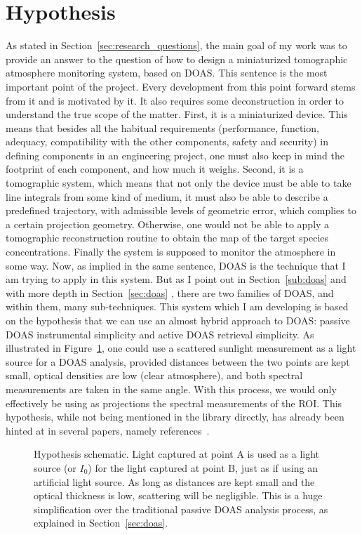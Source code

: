 

\section{Hypothesis}%
\label{sec:intro_hypothesis}

As stated in Section~\ref{sec:research_questions}, the main goal of my
work was to provide an answer to the question of how to design a
miniaturized tomographic atmosphere monitoring system, based on
\gls{DOAS}.  This sentence is the most important point of the project.
Every development from this point forward stems from it and is motivated
by it. It also requires some deconstruction in order to understand the
true scope of the matter. First, it is a miniaturized device. This means
that besides all the habitual requirements (performance, function,
adequacy, compatibility with the other components, safety and security)
in defining components in an engineering project, one must also keep in
mind the footprint of each component, and how much it weighs. Second, it
is a tomographic system, which means that not only the device must be
able to take line integrals from some kind of medium, it must also be
able to describe a predefined trajectory, with admissible levels of
geometric error, which complies to a certain projection geometry.
Otherwise, one would not be able to apply a tomographic reconstruction
routine to obtain the map of the target species concentrations. Finally
the system is supposed to monitor the atmosphere in some way. Now, as
implied in the same sentence, \gls{DOAS} is the technique that I am
trying to apply in this system. But as I point out in
Section~\ref{sub:doas} and with more depth in
Section~\ref{sec:doas} , there are two families of
\gls{DOAS}, and within them, many sub-techniques. This system which I am
developing is based on the hypothesis that we can use an almost hybrid
approach to \gls{DOAS}: passive \gls{DOAS} instrumental simplicity and
active \gls{DOAS} retrieval simplicity. As illustrated in
Figure~\ref{fig:hypothesis}, one could use a scattered sunlight
measurement as a light source for a \gls{DOAS} analysis, provided
distances between the two points are kept small, optical densities are
low (clear atmosphere), and both spectral measurements are taken in the
same angle. With this process, we would only effectively be using as
projections the spectral measurements of the \gls{ROI}. This hypothesis,
while not being mentioned in the library directly, has already been
hinted at in several papers, namely references~\cite{Frins2006,
Casaballe2017, Johansson2009}.

\begin{figure}[htpb]
    \centering
    \missingfigure{}
    \caption{Hypothesis schematic. Light captured at point A is used as
        a light source (or $I_0$) for the light captured at point B,
        just as if using an artificial light source. As long as
        distances are kept small and the optical thickness is low,
        scattering will be negligible.  This is a huge simplification
        over the traditional passive \gls{DOAS} analysis process, as
        explained in Section~\ref{sec:doas}.}
    \label{fig:hypothesis}
\end{figure}
